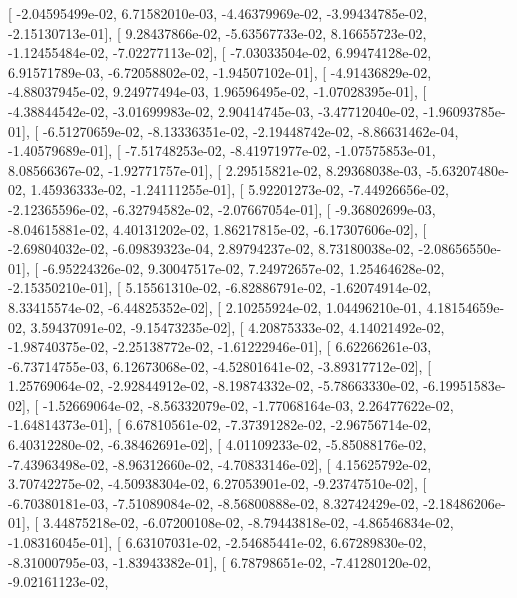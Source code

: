 \documentclass{article}
\begin{document}
       [ -2.04595499e-02,   6.71582010e-03,  -4.46379969e-02,
         -3.99434785e-02,  -2.15130713e-01],
       [  9.28437866e-02,  -5.63567733e-02,   8.16655723e-02,
         -1.12455484e-02,  -7.02277113e-02],
       [ -7.03033504e-02,   6.99474128e-02,   6.91571789e-03,
         -6.72058802e-02,  -1.94507102e-01],
       [ -4.91436829e-02,  -4.88037945e-02,   9.24977494e-03,
          1.96596495e-02,  -1.07028395e-01],
       [ -4.38844542e-02,  -3.01699983e-02,   2.90414745e-03,
         -3.47712040e-02,  -1.96093785e-01],
       [ -6.51270659e-02,  -8.13336351e-02,  -2.19448742e-02,
         -8.86631462e-04,  -1.40579689e-01],
       [ -7.51748253e-02,  -8.41971977e-02,  -1.07575853e-01,
          8.08566367e-02,  -1.92771757e-01],
       [  2.29515821e-02,   8.29368038e-03,  -5.63207480e-02,
          1.45936333e-02,  -1.24111255e-01],
       [  5.92201273e-02,  -7.44926656e-02,  -2.12365596e-02,
         -6.32794582e-02,  -2.07667054e-01],
       [ -9.36802699e-03,  -8.04615881e-02,   4.40131202e-02,
          1.86217815e-02,  -6.17307606e-02],
       [ -2.69804032e-02,  -6.09839323e-04,   2.89794237e-02,
          8.73180038e-02,  -2.08656550e-01],
       [ -6.95224326e-02,   9.30047517e-02,   7.24972657e-02,
          1.25464628e-02,  -2.15350210e-01],
       [  5.15561310e-02,  -6.82886791e-02,  -1.62074914e-02,
          8.33415574e-02,  -6.44825352e-02],
       [  2.10255924e-02,   1.04496210e-01,   4.18154659e-02,
          3.59437091e-02,  -9.15473235e-02],
       [  4.20875333e-02,   4.14021492e-02,  -1.98740375e-02,
         -2.25138772e-02,  -1.61222946e-01],
       [  6.62266261e-03,  -6.73714755e-03,   6.12673068e-02,
         -4.52801641e-02,  -3.89317712e-02],
       [  1.25769064e-02,  -2.92844912e-02,  -8.19874332e-02,
         -5.78663330e-02,  -6.19951583e-02],
       [ -1.52669064e-02,  -8.56332079e-02,  -1.77068164e-03,
          2.26477622e-02,  -1.64814373e-01],
       [  6.67810561e-02,  -7.37391282e-02,  -2.96756714e-02,
          6.40312280e-02,  -6.38462691e-02],
       [  4.01109233e-02,  -5.85088176e-02,  -7.43963498e-02,
         -8.96312660e-02,  -4.70833146e-02],
       [  4.15625792e-02,   3.70742275e-02,  -4.50938304e-02,
          6.27053901e-02,  -9.23747510e-02],
       [ -6.70380181e-03,  -7.51089084e-02,  -8.56800888e-02,
          8.32742429e-02,  -2.18486206e-01],
       [  3.44875218e-02,  -6.07200108e-02,  -8.79443818e-02,
         -4.86546834e-02,  -1.08316045e-01],
       [  6.63107031e-02,  -2.54685441e-02,   6.67289830e-02,
         -8.31000795e-03,  -1.83943382e-01],
       [  6.78798651e-02,  -7.41280120e-02,  -9.02161123e-02,
\end{document}
